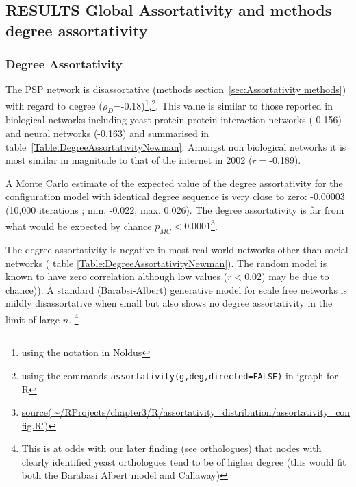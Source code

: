 \clearpage

\subsection{RESULTS Global  Assortativity and methods degree assortativity}
\subsubsection{Degree Assortativity}


 The PSP network is disassortative (methods section~\ref{sec:Assortativity methods}) with regard to degree ($\rho_D$=-0.18)\footnote{using the notation in Noldus\cite{noldus2015assortativity}},\footnote{using the commands \texttt{assortativity(g,deg,directed=FALSE)} in igraph for R}. 
 This value   is similar to those reported in biological networks including yeast protein-protein interaction networks (-0.156) and neural networks (-0.163) \cite{newman2002assortative}  and summarised in table~\ref{Table:DegreeAssortativityNewman}. Amongst non biological networks it is most similar in magnitude to that of the internet in 2002\cite{newman2002assortative} ($r=$-0.189). 

 A Monte Carlo estimate of the expected value of the degree assortativity for the configuration model with identical degree sequence is very close to zero: -0.00003 (10,000 iterations ; min. -0.022, max.  0.026). The degree assortativity is far from what would be expected by chance  $p_{MC}<0.0001$\footnote{\url{source('~/RProjects/chapter3/R/assortativity_distribution/assortativity_config.R')}}.

The degree assortativity is negative in most real world networks other than social networks \cite{newman2002assortative}  ( table \ref{Table:DegreeAssortativityNewman}). The random model is known to have zero correlation although low values ($r<0.02$) may be due to chance)\cite{noldus2015assortativity}). A standard (Barabsi-Albert) generative model for scale free networks is  mildly disassortative\cite{noldus2015assortativity} when small but also shows no degree assortativity in the limit of large $n$\cite{noldus2015assortativity}. \footnote{This is at odds with our later finding (see orthologues) that nodes with clearly identified yeast orthologues tend to be of higher degree (this would fit both the Barabasi Albert model and Callaway)} 

